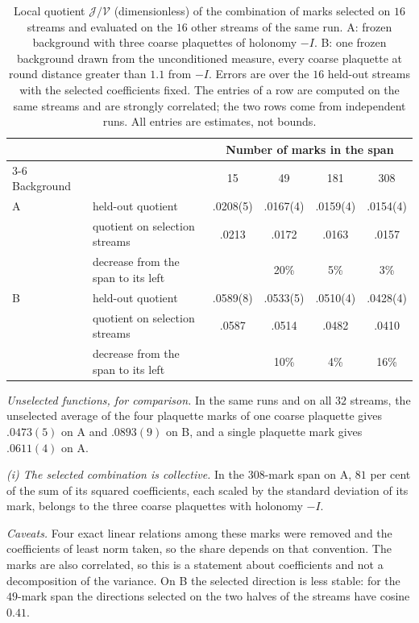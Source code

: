 \begin{table}[ht]
\centering\small
\begin{tabular}{@{}llcccc@{}}
\toprule
 & & \multicolumn{4}{c}{Number of marks in the span} \\
\cmidrule(l){3-6}
Background & & 15 & 49 & 181 & 308 \\
\midrule
A & held-out quotient  & .0208(5) & .0167(4) & .0159(4) & .0154(4) \\
  & quotient on selection streams & .0213 & .0172 & .0163 & .0157 \\
  & decrease from the span to its left &  & 20\% & 5\% & 3\% \\
\addlinespace
B & held-out quotient  & .0589(8) & .0533(5) & .0510(4) & .0428(4) \\
  & quotient on selection streams & .0587 & .0514 & .0482 & .0410 \\
  & decrease from the span to its left &  & 10\% & 4\% & 16\% \\
\bottomrule
\end{tabular}
\caption{Local quotient $\mathcal J/\mathcal V$ (dimensionless) of the combination of marks selected on $16$
streams and evaluated on the $16$ other streams of the same run. A: frozen background with three coarse
plaquettes of holonomy $-I$. B: one frozen background drawn from the unconditioned measure, every coarse
plaquette at round distance greater than $1.1$ from $-I$. Errors are over the $16$ held-out streams with the
selected coefficients fixed. The entries of a row are computed on the same streams and are strongly
correlated; the two rows come from independent runs. All entries are estimates, not bounds.}
\label{tab:local}
\end{table}

\emph{Unselected functions, for comparison.} In the same runs and on all $32$ streams, the unselected average
of the four plaquette marks of one coarse plaquette gives $.0473(5)$ on A and $.0893(9)$ on B, and a single
plaquette mark gives $.0611(4)$ on A.

\emph{{\upshape(i)} The selected combination is collective.} In the $308$-mark span on A, $81$ per cent of
the sum of its squared coefficients, each scaled by the standard deviation of its mark, belongs to the three
coarse plaquettes with holonomy $-I$.

\emph{Caveats.} Four exact linear relations among these marks were removed and the coefficients of least norm
taken, so the share depends on that convention. The marks are also correlated, so this is a statement about
coefficients and not a decomposition of the variance. On B the selected direction is less stable: for the
$49$-mark span the directions selected on the two halves of the streams have cosine $0.41$.

